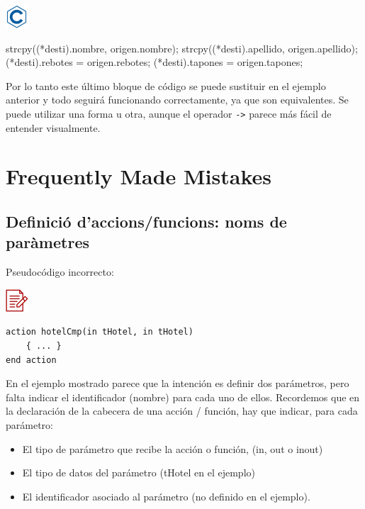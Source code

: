 \documentclass[
]{book}
\newenvironment{Shaded}{\begin{snugshade}}{\end{snugshade}}
\newcommand{\NormalTok}[1]{#1}
\providecommand{\tightlist}{%
  \setlength{\itemsep}{0pt}\setlength{\parskip}{0pt}}
\begin{document}
\includegraphics{./img/c.png}

\begin{Shaded}
\begin{Highlighting}[]
\NormalTok{    strcpy((*desti).nombre, origen.nombre);}
\NormalTok{    strcpy((*desti).apellido, origen.apellido);}
\NormalTok{    (*desti).rebotes = origen.rebotes;}
\NormalTok{    (*desti).tapones = origen.tapones;}
\end{Highlighting}
\end{Shaded}

Por lo tanto este último bloque de código se puede sustituir en el ejemplo anterior y todo seguirá funcionando correctamente, ya que son equivalentes. Se puede utilizar una forma u otra, aunque el operador \texttt{-\textgreater{}} parece más fácil de entender visualmente.

\hypertarget{frequently-made-mistakes-5}{%
\section{Frequently Made Mistakes}\label{frequently-made-mistakes-5}}

\hypertarget{definiciuxf3-daccionsfuncions-noms-de-paruxe0metres}{%
\subsection{Definició d'accions/funcions: noms de paràmetres}\label{definiciuxf3-daccionsfuncions-noms-de-paruxe0metres}}

Pseudocódigo incorrecto:

\includegraphics{./img/alg_err.png}

\begin{verbatim}
action hotelCmp(in tHotel, in tHotel)
    { ... }
end action
\end{verbatim}

En el ejemplo mostrado parece que la intención es definir dos parámetros, pero falta indicar el identificador (nombre) para cada uno de ellos. Recordemos que en la declaración de la cabecera de una acción / función, hay que indicar, para cada parámetro:

\begin{itemize}
\tightlist
\item
  El tipo de parámetro que recibe la acción o función, (in, out o inout)
\item
  El tipo de datos del parámetro (tHotel en el ejemplo)
\item
  El identificador asociado al parámetro (no definido en el ejemplo).
\end{itemize}
\end{document}

